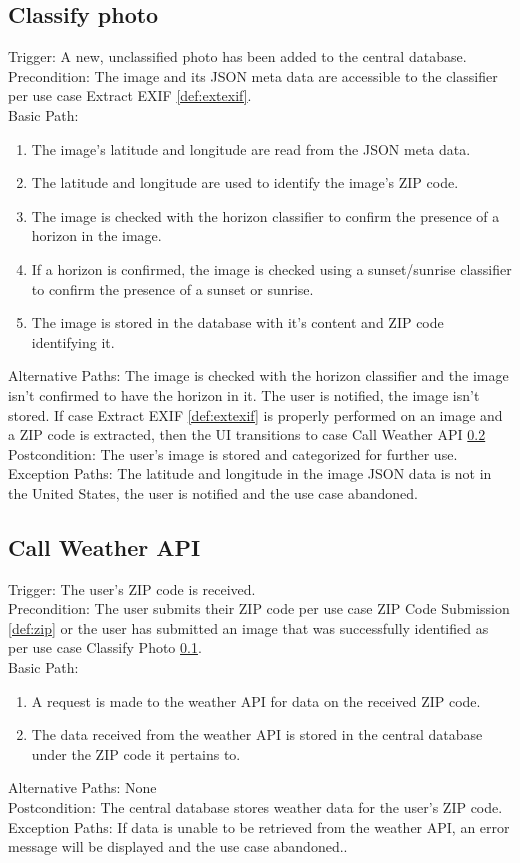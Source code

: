 \documentclass[journal,10pt,draftclsnofoot,onecolumn]{IEEEtran}
\begin{document}
\begin{singlespace}
	\subsection{Classify photo} \label{def:classPh}
		Trigger: A new, unclassified photo has been added to the central database.\\
		Precondition: The image and its JSON meta data are accessible to the classifier per use case Extract EXIF \ref{def:extexif}.\\
		Basic Path:
		\begin{enumerate}
			\item The image's latitude and longitude are read from the JSON meta data.
			\item The latitude and longitude are used to identify the image's ZIP code.
			\item The image is checked with the horizon classifier to confirm the presence of a horizon in the image.
			\item If a horizon is confirmed, the image is checked using a sunset/sunrise classifier to confirm the presence of a sunset or sunrise.
			\item The image is stored in the database with it's content and ZIP code identifying it.
		\end{enumerate}
		Alternative Paths: The image is checked with the horizon classifier and the image isn't confirmed to have the horizon in it. The user is notified, the image isn't stored. If case Extract EXIF \ref{def:extexif} is properly performed on an image and a ZIP code is extracted, then the UI transitions to case Call Weather API \ref{def:weathAPI}\\
		Postcondition: The user's image is stored and categorized for further use.\\
		Exception Paths: The latitude and longitude in the image JSON data is not in the United States, the user is notified and the use case abandoned.
	
	\subsection{Call Weather API} \label{def:weathAPI}
		Trigger: The user's ZIP code is received.\\
		Precondition: The user submits their ZIP code per use case ZIP Code Submission \ref{def:zip} or the user has submitted an image that was successfully identified as per use case Classify Photo \ref{def:classPh}.\\
		Basic Path:
		\begin{enumerate}
			\item A request is made to the weather API for data on the received ZIP code.
			\item The data received from the weather API is stored in the central database under the ZIP code it pertains to.
		\end{enumerate}
		Alternative Paths: None\\
		Postcondition: The central database stores weather data for the user's ZIP code.\\
		Exception Paths: If data is unable to be retrieved from the weather API, an error message will be displayed and the use case abandoned..
	

\end{singlespace}
\end{document}
